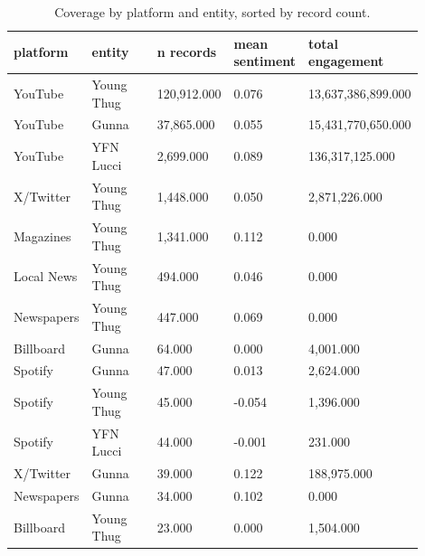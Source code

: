 \documentclass[12pt]{article}
\begin{document}
\begin{table}[H]
\centering
\caption{Coverage by platform and entity, sorted by record count.}
\label{tab:coverage}
\small
\begin{tabular}{p{0.18\linewidth}p{0.18\linewidth}p{0.18\linewidth}p{0.18\linewidth}p{0.18\linewidth}}
\toprule
platform & entity & n records & mean sentiment & total engagement \\
\midrule
YouTube & Young Thug & 120,912.000 & 0.076 & 13,637,386,899.000 \\
YouTube & Gunna & 37,865.000 & 0.055 & 15,431,770,650.000 \\
YouTube & YFN Lucci & 2,699.000 & 0.089 & 136,317,125.000 \\
X/Twitter & Young Thug & 1,448.000 & 0.050 & 2,871,226.000 \\
Magazines & Young Thug & 1,341.000 & 0.112 & 0.000 \\
Local News & Young Thug & 494.000 & 0.046 & 0.000 \\
Newspapers & Young Thug & 447.000 & 0.069 & 0.000 \\
Billboard & Gunna & 64.000 & 0.000 & 4,001.000 \\
Spotify & Gunna & 47.000 & 0.013 & 2,624.000 \\
Spotify & Young Thug & 45.000 & -0.054 & 1,396.000 \\
Spotify & YFN Lucci & 44.000 & -0.001 & 231.000 \\
X/Twitter & Gunna & 39.000 & 0.122 & 188,975.000 \\
Newspapers & Gunna & 34.000 & 0.102 & 0.000 \\
Billboard & Young Thug & 23.000 & 0.000 & 1,504.000 \\
\bottomrule
\end{tabular}
\end{table}


\newpage
\end{document}
